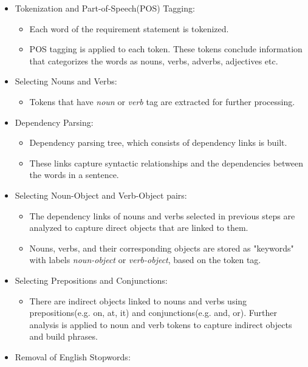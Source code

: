 \begin{itemize}
    \item Tokenization and Part-of-Speech(POS) Tagging:
        \begin{itemize}
            \item Each word of the requirement statement is tokenized.
            \item POS tagging is applied to each token. These tokens conclude information that categorizes the words as nouns, verbs, adverbs, adjectives etc.
        \end{itemize}
    \item Selecting Nouns and Verbs:
        \begin{itemize}
            \item Tokens that have \textit{noun} or \textit{verb} tag are extracted for further processing.
        \end{itemize}
    \item Dependency Parsing:
        \begin{itemize}
            \item Dependency parsing tree, which consists of dependency links is built.
            \item These links capture syntactic relationships and the dependencies between the words in a sentence.
        \end{itemize}
    \item Selecting Noun-Object and Verb-Object pairs:
        \begin{itemize}
            \item The dependency links of nouns and verbs selected in previous steps are analyzed to capture direct objects that are linked to them. 
            \item Nouns, verbs, and their corresponding objects are stored as "keywords" with labels \textit{noun-object} or \textit{verb-object}, based on the token tag. 
        \end{itemize}
    \item Selecting Prepositions and Conjunctions:
        \begin{itemize}
            \item There are indirect objects linked to nouns and verbs using prepositions(e.g. on, at, it) and conjunctions(e.g. and, or). Further analysis is applied to noun and verb tokens to capture indirect objects and build phrases.
        \end{itemize}
    \item Removal of English Stopwords:

\end{itemize}
